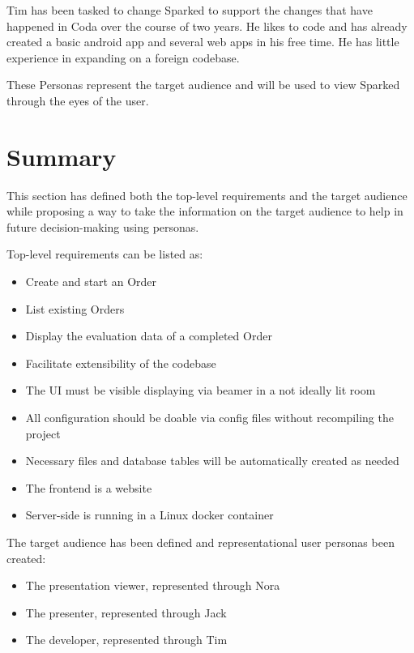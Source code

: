Tim has been tasked to change Sparked to support the changes that have happened in Coda over the course of two years. He likes to code and has already created a basic android app and several web apps in his free time. He has little experience in expanding on a foreign codebase.

These Personas represent the target audience and will be used to view Sparked through the eyes of the user.

\section{Summary}
This section has defined both the top-level requirements and the target audience while proposing a way to take the information on the target audience to help in future decision-making using personas.

Top-level requirements can be listed as:
\begin{itemize}
\item Create and start an Order
\item List existing Orders
\item Display the evaluation data of a completed Order
\item Facilitate extensibility of the codebase
\item The UI must be visible displaying via beamer in a not ideally lit room
\item All configuration should be doable via config files without recompiling the project
\item Necessary files and database tables will be automatically created as needed
\item The frontend is a website 
\item Server-side is running in a Linux docker container

\end{itemize}

The target audience has been defined and representational user personas been created:
\begin{itemize}
\item	The presentation viewer, represented through Nora
\item	The presenter, represented through Jack
\item	The developer, represented through Tim
\end{itemize}


